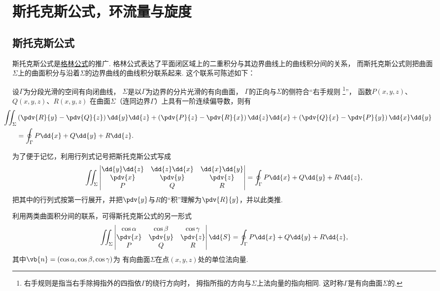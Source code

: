 \section{斯托克斯公式，环流量与旋度}
\subsection{斯托克斯公式}
斯托克斯公式是\hyperref[equation:线积分与面积分.格林公式]{格林公式}的推广.
格林公式表达了平面闭区域上的二重积分与其边界曲线上的曲线积分间的关系，
而斯托克斯公式则把曲面\(\Sigma\)上的曲面积分与沿着\(\Sigma\)的边界曲线的曲线积分联系起来.
这个联系可陈述如下：

\begin{theorem}[斯托克斯公式]
设\(\Gamma\)为分段光滑的空间有向闭曲线，
\(\Sigma\)是以\(\Gamma\)为边界的分片光滑的有向曲面，
\(\Gamma\)的正向与\(\Sigma\)的侧符合“右手规则%
\footnote{右手规则是指当右手除拇指外的四指依\(\Gamma\)的绕行方向时，
拇指所指的方向与\(\Sigma\)上法向量的指向相同.
这时称\(\Gamma\)是有向曲面\(\Sigma\)的.}”，
函数\(P(x,y,z)\)、\(Q(x,y,z)\)、\(R(x,y,z)\)
在曲面\(\Sigma\)（连同边界\(\Gamma\)）上具有一阶连续偏导数，则有
\begin{equation}\label{equation:线积分与面积分.斯托克斯公式}
	\begin{split}
		&\hspace{-20pt}\iint_\Sigma
			\left( \pdv{R}{y} - \pdv{Q}{z} \right)\dd{y}\dd{z}
			+\left( \pdv{P}{z} - \pdv{R}{x} \right)\dd{z}\dd{x}
			+\left( \pdv{Q}{x} - \pdv{P}{y} \right)\dd{x}\dd{y} \\
		&= \oint_\Gamma P\dd{x}+Q\dd{y}+R\dd{z}.
	\end{split}
\end{equation}
\end{theorem}

为了便于记忆，利用行列式记号把斯托克斯公式写成\begin{equation*}
	\iint_\Sigma \begin{vmatrix}
		\dd{y}\dd{z} & \dd{z}\dd{x} & \dd{x}\dd{y} \\
		\pdv{x} & \pdv{y} & \pdv{z} \\
		P & Q & R
	\end{vmatrix}
	= \oint_\Gamma P\dd{x}+Q\dd{y}+R\dd{z},
\end{equation*}
把其中的行列式按第一行展开，并把\(\pdv{y}\)与\(R\)的“积”理解为\(\pdv{R}{y}\)，并以此类推.

利用两类曲面积分间的联系，可得斯托克斯公式的另一形式\begin{equation*}
	\iint_\Sigma \begin{vmatrix}
		\cos\alpha & \cos\beta & \cos\gamma \\
		\pdv{x} & \pdv{y} & \pdv{z} \\
		P & Q & R
	\end{vmatrix} \dd{S}
	= \oint_\Gamma P\dd{x}+Q\dd{y}+R\dd{z},
\end{equation*}
其中\(\vb{n}=(\cos\alpha,\cos\beta,\cos\gamma)\)为
有向曲面\(\Sigma\)在点\((x,y,z)\)处的单位法向量.

